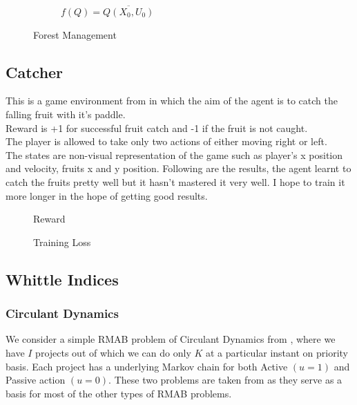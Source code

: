 \documentclass{article}
\theoremstyle{definition}
\begin{document}
\begin{figure}[H]
\begin{subfigure}{0.48\linewidth}
         \caption*{$f(Q) = \overline{Q(X_0,U_0)}$}
         \label{}
     \end{subfigure}
     \caption{Forest Management}
     \label{Forest Management}
\end{figure}


\subsection{Catcher}
This is a game environment from \cite{tasfi2016PLE} in which the aim of the agent is to catch the falling fruit with it's paddle.\\
Reward is +1 for successful fruit catch and -1 if the fruit is not caught.\\
The player is allowed to take only two actions of either moving right or left.\\
The states are non-visual representation of the game such as player's x position and velocity, fruits x and y position.
Following are the results, the agent learnt to catch the fruits pretty well but it hasn't mastered it very well. I hope to train it more longer in the hope of getting good results.
\begin{figure}[htbp]
    \centering
    
    \caption{Reward}
    \label{fig:my_label}
\end{figure}
    
\begin{figure}[htbp]
    \centering
    
    \caption{Training Loss}
    \label{fig:my_label}
\end{figure}

\subsection{Whittle Indices}

\subsubsection{Circulant Dynamics}
We consider a simple RMAB problem of Circulant Dynamics from  \cite{circulantdynamics}, where we have $I$ projects out of which we can do only $K$ at a particular instant on priority basis. Each project has a underlying Markov chain for both Active $(u=1)$ and Passive action $(u=0)$. These two problems are taken from \cite{avrachenkov2021whittle} as they serve as a basis for most of the other types of RMAB problems.
\end{document}
